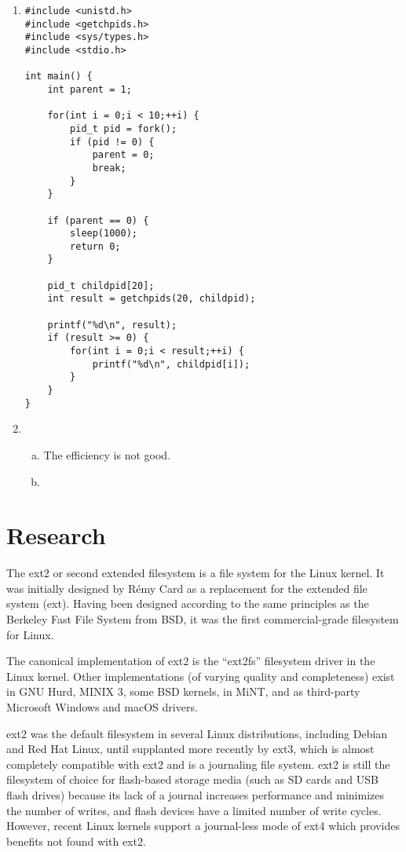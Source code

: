 \documentclass{article}
\begin{document}
\begin{enumerate}
\begin{verbatim}
// Implemented in user library <getchpids.h>
int getchpids(int n, pid_t *childpid) {
    message m;
    m.m_lc_pm_getchpid.n = n;
    m_in.m_lc_pm_getchpid.childpid = childpid;
    return _syscall(PM_PROC_NR, PM_GETCHPID, &m);
}
\end{verbatim}

\item
\begin{verbatim}
#include <unistd.h>
#include <getchpids.h>
#include <sys/types.h>
#include <stdio.h>

int main() {
    int parent = 1;

    for(int i = 0;i < 10;++i) {
        pid_t pid = fork();
        if (pid != 0) {
            parent = 0;
            break;
        }
    }

    if (parent == 0) {
        sleep(1000);
        return 0;
    }

    pid_t childpid[20];
    int result = getchpids(20, childpid);

    printf("%d\n", result);
    if (result >= 0) {
        for(int i = 0;i < result;++i) {
            printf("%d\n", childpid[i]);
        }
    }
}
\end{verbatim}
\item
\begin{enumerate}[a)]
\item The efficiency is not good.
\item 
\end{enumerate}
\end{enumerate}

\section{Research}
The ext2 or second extended filesystem is a file system for the Linux kernel. It was initially designed by Rémy Card as a replacement for the extended file system (ext). Having been designed according to the same principles as the Berkeley Fast File System from BSD, it was the first commercial-grade filesystem for Linux.

The canonical implementation of ext2 is the ``ext2fs'' filesystem driver in the Linux kernel. Other implementations (of varying quality and completeness) exist in GNU Hurd, MINIX 3, some BSD kernels, in MiNT, and as third-party Microsoft Windows and macOS drivers.

ext2 was the default filesystem in several Linux distributions, including Debian and Red Hat Linux, until supplanted more recently by ext3, which is almost completely compatible with ext2 and is a journaling file system. ext2 is still the filesystem of choice for flash-based storage media (such as SD cards and USB flash drives) because its lack of a journal increases performance and minimizes the number of writes, and flash devices have a limited number of write cycles. However, recent Linux kernels support a journal-less mode of ext4 which provides benefits not found with ext2. \\
\end{document}
